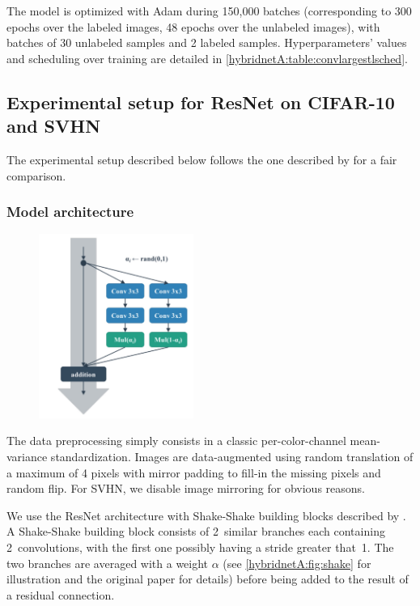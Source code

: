 The model is optimized with Adam during 150,000 batches (corresponding to 300 epochs over the labeled images, 48 epochs over the unlabeled images), with batches of 30 unlabeled samples and 2 labeled samples.
Hyperparameters' values and scheduling over training are detailed in \autoref{hybridnetA:table:convlargestlsched}.


\subsection{Experimental setup for ResNet on CIFAR-10 and SVHN}

The experimental setup described below follows the one described by \citet{Tarvainen2017} for a fair comparison.

\subsubsection{Model architecture}

\begin{figure}[tb]
	\centering
    \includegraphics[width=0.45\textwidth]{images/hybridnet_shakeshake}
    \label{hybridnetA:fig:shake}
\end{figure}

The data preprocessing simply consists in a classic per-color-channel mean-variance standardization. Images are data-augmented using random translation of a maximum of 4 pixels with mirror padding to fill-in the missing pixels and random flip. For SVHN, we disable image mirroring for obvious reasons.

We use the ResNet architecture with Shake-Shake building blocks described by \citet{Gastaldi2017}. A Shake-Shake building block consists of 2~similar branches each containing 2~convolutions, with the first one possibly having a stride greater that~1. The two branches are averaged with a weight $\alpha$ (see \autoref{hybridnetA:fig:shake} for illustration and the original paper for details) before being added to the result of a residual connection.

